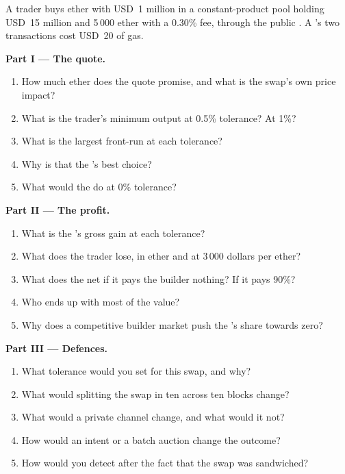 \begin{problem}\label{pb:m3:maximal-extractable-value:1}
A trader buys ether with USD~1 million in a constant-product pool holding USD~15 million and 5\,000 ether with a 0.30\% fee, through the public
. A 's two transactions cost USD~20 of gas.

\medskip\noindent\textbf{Part I --- The quote.}
\begin{enumerate}
\item How much ether does the quote promise, and what is the swap's own price impact?
\item What is the trader's minimum output at 0.5\% tolerance? At 1\%?
\item What is the largest front-run at each tolerance?
\item Why is that the 's best choice?
\item What would the  do at 0\% tolerance?
\end{enumerate}

\medskip\noindent\textbf{Part II --- The profit.}
\begin{enumerate}[resume]
\item What is the 's gross gain at each tolerance?
\item What does the trader lose, in ether and at 3\,000 dollars per ether?
\item What does the  net if it pays the builder nothing? If it pays 90\%?
\item Who ends up with most of the value?
\item Why does a competitive builder market push the 's share towards zero?
\end{enumerate}

\medskip\noindent\textbf{Part III --- Defences.}
\begin{enumerate}[resume]
\item What tolerance would you set for this swap, and why?
\item What would splitting the swap in ten across ten blocks change?
\item What would a private channel change, and what would it not?
\item How would an intent or a batch auction change the outcome?
\item How would you detect after the fact that the swap was sandwiched?
\end{enumerate}


\end{problem}
